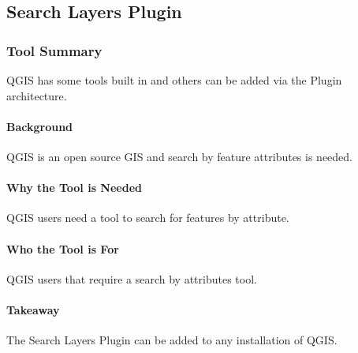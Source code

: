 %
%
%
%   

\subsection{Search Layers Plugin}
\subsubsection{Tool Summary}
QGIS has some tools built in and others can be added via the Plugin architecture.
%

\begin{adjmulticols}{2}{\innerMar}{\outerMar}
\paragraph{Background}
QGIS is an open source GIS and search by feature attributes is needed.
\paragraph{Why the Tool is Needed}
QGIS users need a tool to search for features by attribute.
\paragraph{Who the Tool is For}
QGIS users that require a search by attributes tool.
\paragraph{Takeaway}
The Search Layers Plugin can be added to any installation of QGIS.
\end{adjmulticols}
\clearpage

